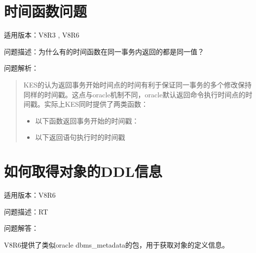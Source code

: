 \documentclass[a4,10pt,oneside,english]{sphinxmanual}
\begin{document}
\section{时间函数问题}
\label{\detokenize{sql:id21}}
适用版本：V8R3 , V8R6

问题描述：为什么有的时间函数在同一事务内返回的都是同一值？

问题解析：
\begin{quote}

KES的认为返回事务开始时间点的时间有利于保证同一事务的多个修改保持同样的时间戳。这点与oracle机制不同，oracle默认返回命令执行时间点的时间戳。实际上KES同时提供了两类函数：
\begin{itemize}
\item {} 
以下函数返回事务开始的时间戳：

\end{itemize}
\begin{quote}

\begin{sphinxVerbatim}[commandchars=\\\{\}]
\end{sphinxVerbatim}
\end{quote}
\begin{itemize}
\item {} 
以下返回语句执行时的时间戳

\end{itemize}
\begin{quote}

\begin{sphinxVerbatim}[commandchars=\\\{\}]
\end{sphinxVerbatim}
\end{quote}
\end{quote}


\section{如何取得对象的DDL信息}
\label{\detokenize{sql:ddl}}
适用版本：V8R6

问题描述：RT

问题解答：

V8R6提供了类似oracle dbms\_metadata的包，用于获取对象的定义信息。
\end{document}
